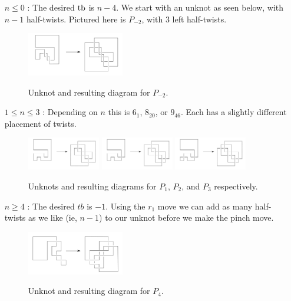 \begin{itemize}

    \item[$n \leq 0$ :]
        The desired $\operatorname{tb}$ is $n-4$. We start with an unknot as seen below, with $n-1$ half-twists. Pictured here is $P_{-2}$, with 3 left half-twists.
        \begin{figure}[h!]
            \centering
            \includegraphics[width=0.4\textwidth]{images/pretzel--2-construction.pdf}
            \label{fig:pretzel-2}
            \caption{Unknot and resulting diagram for $P_{-2}$.}
        \end{figure}

    \item[$1 \leq n \leq 3$ :]
        Depending on $n$ this is $6_1$, $8_{20}$, or $9_{46}$. Each has a slightly different placement of twists.
        \begin{figure}[h!]
            \centering
            \includegraphics[width=0.3\textwidth]{images/pretzel-+1-construction.pdf} \hfill
            \includegraphics[width=0.3\textwidth]{images/pretzel-+2-construction.pdf} \hfill
            \includegraphics[width=0.3\textwidth]{images/pretzel-+3-construction.pdf}
            \label{fig:pretzel-singles}
            \caption{Unknots and resulting diagrams for $P_1$, $P_2$, and $P_3$ respectively.}
        \end{figure}

    \item[$n \geq 4$ :]
        The desired $tb$ is $-1$. Using the $r_1$ move we can add as many half-twists as we like (ie, $n - 1$) to our unknot before we make the pinch move.
        \begin{figure}[h!]
            \centering
            \includegraphics[width=0.4\textwidth]{images/pretzel-+4-construction.pdf}
            \label{fig:pretzel+4}
            \caption{Unknot and resulting diagram for $P_{4}$.}
        \end{figure}

\end{itemize}
